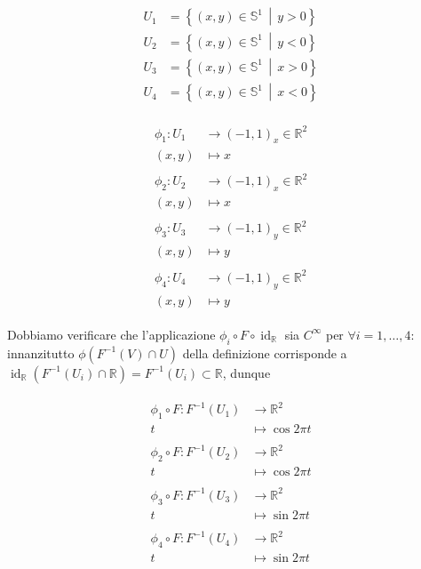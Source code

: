 \begin{align}
	\begin{split}
		U_{1} &= \left\{ (x,y) \in \mathbb{S}^{1} \, \middle| \, y>0 \right\}\\
		U_{2} &= \left\{ (x,y) \in \mathbb{S}^{1} \, \middle| \, y<0 \right\}\\
		U_{3} &= \left\{ (x,y) \in \mathbb{S}^{1} \, \middle| \, x>0 \right\}\\
		U_{4} &= \left\{ (x,y) \in \mathbb{S}^{1} \, \middle| \, x<0 \right\}
	\end{split}	
\end{align}

\begin{align}
	\begin{split}
		\phi_{1} : U_{1} &\to (-1,1)_{x} \in \mathbb{R}^{2}\\
		(x,y) &\mapsto x\\\\
		\phi_{2} : U_{2} &\to (-1,1)_{x} \in \mathbb{R}^{2}\\
		(x,y) &\mapsto x\\\\
		\phi_{3} : U_{3} &\to (-1,1)_{y} \in \mathbb{R}^{2}\\
		(x,y) &\mapsto y\\\\
		\phi_{4} : U_{4} &\to (-1,1)_{y} \in \mathbb{R}^{2}\\
		(x,y) &\mapsto y
	\end{split}
\end{align}

Dobbiamo verificare che l'applicazione $ \phi_{i} \circ F \circ \operatorname{id}_{\mathbb{R}} $ sia $ C^{\infty} $ per $ \forall i=1,\dots,4 $: innanzitutto $ \phi(F^{-1}(V) \cap U) $ della definizione corrisponde a $ \operatorname{id}_{\mathbb{R}}(F^{-1}(U_{i}) \cap \mathbb{R}) = F^{-1}(U_{i}) \subset \mathbb{R} $, dunque

\begin{align}
	\begin{split}
		\phi_{1} \circ F : F^{-1}(U_{1}) &\to \mathbb{R}^{2}\\
		t &\mapsto \cos 2 \pi t\\\\
		\phi_{2} \circ F : F^{-1}(U_{2}) &\to \mathbb{R}^{2}\\
		t &\mapsto \cos 2 \pi t\\\\
		\phi_{3} \circ F : F^{-1}(U_{3}) &\to \mathbb{R}^{2}\\
		t &\mapsto \sin 2 \pi t\\\\
		\phi_{4} \circ F : F^{-1}(U_{4}) &\to \mathbb{R}^{2}\\
		t &\mapsto \sin 2 \pi t
	\end{split}
\end{align}

